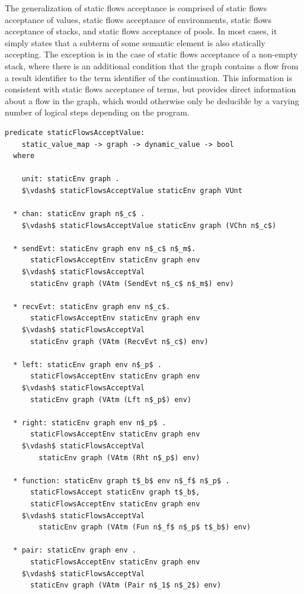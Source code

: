 \documentclass[letterpaper, 11pt]{report}
\begin{document}
The generalization of static flows acceptance is comprised of static flows acceptance of values,
static flows acceptance of environments, static flows acceptance of stacks, and static
flows acceptance of pools.
In most cases, it simply states that a subterm of some semantic element is also statically
accepting. The exception is in the case of
static flows acceptance of a non-empty stack, where
there is an additional condition that the graph contains a
flow from a result identifier to the term identifier
of the continuation.
This information is consistent with static
flows acceptance of terms, but provides direct information about a flow in the
graph, which would otherwise only be deducible by a varying number of logical steps
depending on the program.

\begin{lstlisting}[language=logic, mathescape]
  predicate staticFlowsAcceptValue:
    static_value_map -> graph -> dynamic_value -> bool
  where

    unit: staticEnv graph .
    $\vdash$ staticFlowsAcceptValue staticEnv graph VUnt

  * chan: staticEnv graph n$_c$ .
    $\vdash$ staticFlowsAcceptValue staticEnv graph (VChn n$_c$)

  * sendEvt: staticEnv graph env n$_c$ n$_m$.
      staticFlowsAcceptEnv staticEnv graph env 
    $\vdash$ staticFlowsAcceptVal
      staticEnv graph (VAtm (SendEvt n$_c$ n$_m$) env)

  * recvEvt: staticEnv graph env n$_c$.
      staticFlowsAcceptEnv staticEnv graph env 
    $\vdash$ staticFlowsAcceptVal
      staticEnv graph (VAtm (RecvEvt n$_c$) env)

  * left: staticEnv graph env n$_p$ .
      staticFlowsAcceptEnv staticEnv graph env 
    $\vdash$ staticFlowsAcceptVal
      staticEnv graph (VAtm (Lft n$_p$) env)

  * right: staticEnv graph env n$_p$ .
      staticFlowsAcceptEnv staticEnv graph env
    $\vdash$ staticFlowsAcceptVal
        staticEnv graph (VAtm (Rht n$_p$) env)

  * function: staticEnv graph t$_b$ env n$_f$ n$_p$ .
      staticFlowsAccept staticEnv graph t$_b$, 
      staticFlowsAcceptEnv staticEnv graph env
    $\vdash$ staticFlowsAcceptVal
        staticEnv graph (VAtm (Fun n$_f$ n$_p$ t$_b$) env)

  * pair: staticEnv graph env . 
      staticFlowsAcceptEnv staticEnv graph env
    $\vdash$ staticFlowsAcceptVal
      staticEnv graph (VAtm (Pair n$_1$ n$_2$) env)


\end{lstlisting}
\end{document}

